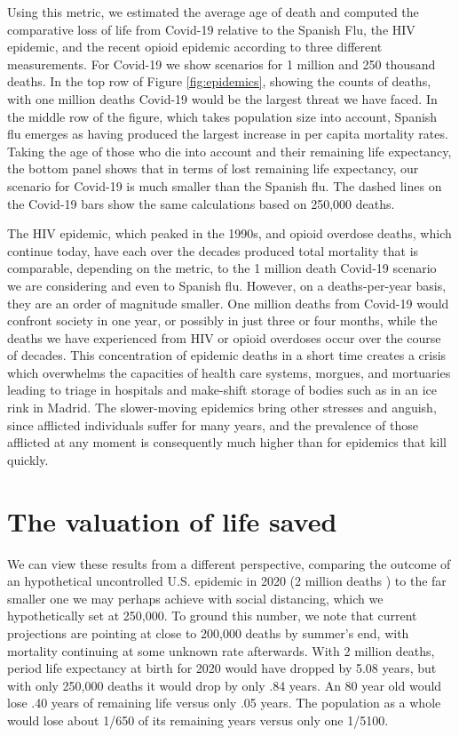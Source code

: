\documentclass[9pt,twocolumn,twoside,lineno]{pnas-new}
\begin{document}
Using this metric, we estimated the average age of death and computed
the comparative loss of life from Covid-19 relative to the Spanish
Flu, the HIV epidemic, and the recent opioid epidemic according to
three different measurements. For Covid-19 we show scenarios for 1
million and 250 thousand deaths. In the top row of Figure \ref{fig:epidemics}, showing
the counts of deaths, with one million deaths Covid-19 would be the
largest threat we have faced. In the middle row of the figure, which
takes population size into account, Spanish flu emerges as having
produced the largest increase in per capita mortality rates. Taking the age
of those who die into account and their remaining life expectancy, the
bottom panel shows that in terms of lost remaining life expectancy,
our scenario for Covid-19 is much smaller than the Spanish flu. The
dashed lines on the Covid-19 bars show the same calculations based on
250,000 deaths.

The HIV epidemic, which peaked in the 1990s, and opioid overdose
deaths, which continue today, have each over the decades produced
total mortality that is comparable, depending on the metric, to the 1
million death Covid-19 scenario we are considering and even to Spanish
flu. However, on a deaths-per-year basis, they are an order of
magnitude smaller. One million deaths from Covid-19
would confront society in one year, or possibly in just three or four
months, while the deaths we have experienced from HIV or opioid
overdoses occur over the course of decades. This concentration of
epidemic deaths in a short time creates a crisis which overwhelms the
capacities of health care systems, morgues, and mortuaries leading to
triage in hospitals and make-shift storage of bodies such as in an ice
rink in Madrid. The slower-moving epidemics bring other
stresses and anguish, since afflicted individuals suffer for many
years, and the prevalence of those afflicted at any moment is
consequently much higher than for epidemics that kill quickly.

\section*{The valuation of life saved}

We can view these results from a different perspective, comparing the
outcome of an hypothetical uncontrolled U.S. epidemic in 2020 (2 million
deaths \cite{ferguson:2020}) to the far smaller one we may perhaps
achieve with social distancing, which we hypothetically set at
250,000. To ground this number, we note that current projections are
pointing at close to 200,000 deaths by summer's end, with mortality
continuing at some unknown rate afterwards\cite{cdc:2020}. With 2 million deaths, 
period life expectancy at birth for 2020 would have dropped by 5.08 years, 
but with only 250,000 deaths it would drop by only .84 years. An 80 year 
old would lose .40 years of remaining life versus only .05 years. The 
population as a whole would lose about 1/650 of its remaining years
versus only one 1/5100.
\end{document}
